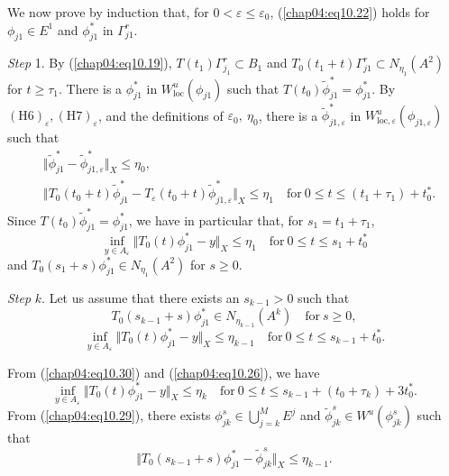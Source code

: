 \documentclass{surv-l}
\theoremstyle{plain}
\theoremstyle{definition}
\numberwithin{equation}{section}
\numberwithin{figure}{chapter}
\begin{document}
We now prove by induction that, for $0<\varepsilon\leq\varepsilon_{0}$, (\ref{chap04:eq10.22}) holds for $\phi_{j1}\in E^{1}$ and $\phi_{j1}^{\ast}$ in $\Gamma_{j1}^{r}$.

\emph{Step} 1. By (\ref{chap04:eq10.19}), $T(t_{1})\Gamma_{j_1}^{r}\subset B_{1}$ and $T_{0}(t_{1}+t)\Gamma_{j1}^{r}\subset N_{\eta_{1}}(A^{2})$ for $t\geq\tau_{1}$. There is a $\phi_{j{1}}^{\ast}$ in $W_{\mathrm{loc}}^{u}(\phi_{j1})$ such that $T(t_{0})\tilde{\phi}_{j1}^{\ast}=\phi_{j1}^{\ast}$. By $\mathrm{(H6)}_{\varepsilon},\mathrm{(H7)}_{\varepsilon}$, and the definitions of $\varepsilon_{0},\ \eta_{0}$, there is a $\tilde{\phi}_{j{1,\varepsilon}}^{\ast}$ in $W_{\mathrm{loc},\varepsilon}^{u}(\phi_{j1,\varepsilon})$ such that
\begin{align*}
&\Vert\tilde{\phi}_{j{1}}^{\ast}-\tilde{\phi}_{j{1,\varepsilon}}^{\ast}\Vert_{X}\leq\eta_{0},\\
&\Vert T_{0}(t_{0}+t)\tilde{\phi}_{j1}^{\ast}-T_{\varepsilon}(t_{0}+t)\tilde{\phi}_{j{1,\varepsilon}}^{\ast}\Vert_{X}\leq\eta_{1}\quad \mathrm{for}\ 0\leq t\leq(t_{1}+\tau_{1})+t_{0}^{\ast}.
\end{align*}
Since $T(t_{0})\tilde{\phi}_{j{1}}^{\ast}=\phi_{j1}^{\ast}$, we have in particular that, for $s_{1}=t_{1}+\tau_{1}$,
\begin{equation}\label{chap04:eq10.28}
\inf_{y\in A_{\varepsilon}}\Vert T_{0}(t)\phi_{j{1}}^{\ast}-y\Vert_{X}\leq\eta_{1}\quad \mathrm{for}\ 0\leq t\leq s_{1}+t_{0}^{\ast}
\end{equation}
and $T_{0}(s_{1}+s)\phi_{j1}^{\ast}\in N_{\eta_{1}}(A^{2})$ for $s\geq 0$.

\emph{Step} $k$. Let us assume that there exists an $s_{k-1}>0$ such that
\begin{equation}\label{chap04:eq10.29}
T_{0}(s_{k-1}+s)\phi_{j1}^{\ast}\in N_{\eta_{k-1}}(A^{k})\quad \mathrm{for}\ s\geq 0,
\end{equation}
\begin{equation}\label{chap04:eq10.30}
\inf_{y\in A_{\varepsilon}}\Vert T_{0}(t)\phi^{\ast}_{j 1}-y\Vert_{X}\leq\eta_{k-1}\quad \mathrm{for}\ 0\leq t\leq s_{k-1}+t_{0}^{\ast}.
\end{equation}

From (\ref{chap04:eq10.30}) and (\ref{chap04:eq10.26}), we have
\begin{equation}\label{chap04:eq10.31}
\inf_{y\in A_{\varepsilon}}\Vert T_{0}(t)\phi_{j1}^{\ast}-y\Vert_{X}\leq\eta_{k}\quad \mathrm{for}\ 0\leq t\leq s_{k-1}+(t_{0}+\tau_{k})+3t_{0}^{\ast}.
\end{equation}
From (\ref{chap04:eq10.29}), there exists $\phi_{jk}^{s}\in\bigcup_{j=k}^{M}E^{j}$ and $\tilde{\phi}_{jk}^{s}\in W^{u}(\phi_{jk}^{s})$ such that
\begin{equation}\label{chap04:eq10.32}
\Vert T_{0}(s_{k-1}+s)\phi_{j1}^{\ast}-\tilde{\phi}_{j{k}}^{s}\Vert_{X}\leq\eta_{k-1}.
\end{equation}
\end{document}
